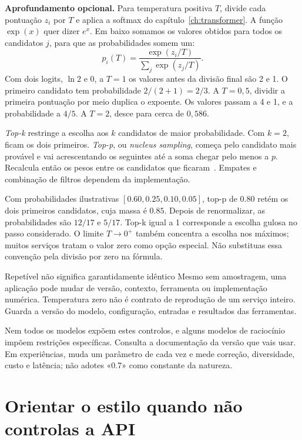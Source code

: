 \textbf{Aprofundamento opcional.} Para temperatura positiva $T$, divide cada pontuação $z_i$ por $T$ e aplica a softmax do capítulo~\ref{ch:transformer}. A função $\exp(x)$ quer dizer $e^x$. Em baixo somamos os valores obtidos para todos os candidatos $j$, para que as probabilidades somem um:
\[
p_i(T)=\frac{\exp(z_i/T)}{\sum_j\exp(z_j/T)}.
\]
Com dois logits, $\ln 2$ e $0$, a $T=1$ os valores antes da divisão final são 2 e 1. O primeiro candidato tem probabilidade $2/(2+1)=2/3$. A $T=0{,}5$, dividir a primeira pontuação por meio duplica o expoente. Os valores passam a 4 e 1, e a probabilidade a $4/5$. A $T=2$, desce para cerca de $0{,}586$.

\emph{Top-k} restringe a escolha aos $k$ candidatos de maior probabilidade. Com $k=2$, ficam os dois primeiros. \emph{Top-p}, ou \emph{nucleus sampling}, começa pelo candidato mais provável e vai acrescentando os seguintes até a soma chegar pelo menos a $p$. Recalcula então os pesos entre os candidatos que ficaram~\citep{holtzman2020}. Empates e combinação de filtros dependem da implementação.

Com probabilidades ilustrativas $[0.60,0.25,0.10,0.05]$, top-p de $0.80$ retém os dois primeiros candidatos, cuja massa é $0.85$. Depois de renormalizar, as probabilidades são $12/17$ e $5/17$. Top-k igual a 1 corresponde a escolha gulosa no passo considerado. O limite $T\to0^+$ também concentra a escolha nos máximos; muitos serviços tratam o valor zero como opção especial. Não substituas essa convenção pela divisão por zero na fórmula.

\begin{warningboxenv}{Repetível não significa garantidamente idêntico}
Mesmo sem amostragem, uma aplicação pode mudar de versão, contexto, ferramenta ou implementação numérica. Temperatura zero não é contrato de reprodução de um serviço inteiro. Guarda a versão do modelo, configuração, entradas e resultados das ferramentas.
\end{warningboxenv}

Nem todos os modelos expõem estes controlos, e alguns modelos de raciocínio impõem restrições específicas. Consulta a documentação da versão que vais usar. Em experiências, muda um parâmetro de cada vez e mede correção, diversidade, custo e latência; não adotes «0.7» como constante da natureza.


\section{Orientar o estilo quando não controlas a API}

